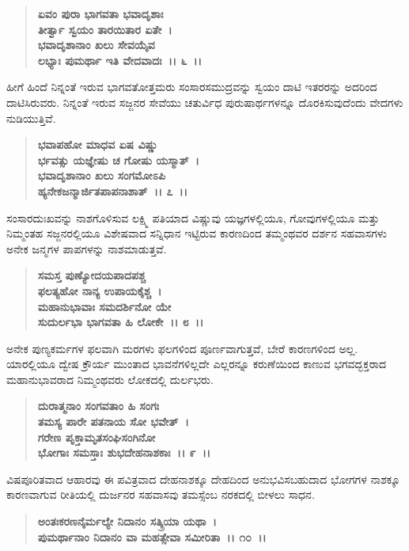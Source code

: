 \begin{verse}
\textbf{ಏವಂ ಪುರಾ ಭಾಗವತಾ ಭವಾದೃಶಾಃ} \\\textbf{ತೀರ್ತ್ವಾ ಸ್ವಯಂ ತಾರಯಿತಾರ ಏತೇ~।}\\\textbf{ಭವಾದೃಶಾನಾಂ ಖಲು ಸೇವಯೈವ} \\\textbf{ಲಭ್ಯಾಃ ಪುಮರ್ಥಾ ಇತಿ ವೇದವಾದಃ~।। ೬~।।}
\end{verse}

ಹೀಗೆ ಹಿಂದೆ ನಿನ್ನಂತೆ ಇರುವ ಭಾಗವತೋತ್ತಮರು ಸಂಸಾರಸಮುದ್ರವನ್ನು ಸ್ವಯಂ ದಾಟಿ ಇತರರನ್ನು ಅದರಿಂದ ದಾಟಿಸಿರುವರು. ನಿನ್ನಂತೆ ಇರುವ ಸಜ್ಜನರ ಸೇವೆಯು ಚತುರ್ವಿಧ ಪುರುಷಾರ್ಥಗಳನ್ನೂ ದೊರಕಿಸುವುದೆಂದು ವೇದಗಳು ನುಡಿಯುತ್ತಿವೆ.

\begin{verse}
\textbf{ಭವಾಪಹೋ ಮಾಧವ ಏಷ ವಿಷ್ಣು} \\\textbf{ರ್ಭವತ್ಸು ಯಜ್ಞೇಷು ಚ ಗೋಷು ಯಸ್ಮಾತ್~।}\\\textbf{ಭವಾದೃಶಾನಾಂ ಖಲು ಸಂಗಮೋಽಪಿ} \\\textbf{ಹ್ಯನೇಕಜನ್ಮಾರ್ಜಿತಪಾಪನಾಶಾತ್~।। ೭~।।}
\end{verse}

ಸಂಸಾರದುಃಖವನ್ನು ನಾಶಗೊಳಿಸುವ ಲಕ್ಷ್ಮಿ ಪತಿಯಾದ ವಿಷ್ಣುವು ಯಜ್ಞಗಳಲ್ಲಿಯೂ, ಗೋವುಗಳಲ್ಲಿಯೂ ಮತ್ತು ನಿಮ್ಮಂತಹ ಸಜ್ಜನರಲ್ಲಿಯೂ ವಿಶೇಷವಾದ ಸನ್ನಿಧಾನ ಇಟ್ಟಿರುವ ಕಾರಣದಿಂದ ತಮ್ಮಂಥವರ ದರ್ಶನ ಸಹವಾಸಗಳು ಅನೇಕ ಜನ್ಮಗಳ ಪಾಪಗಳನ್ನು ನಾಶಮಾಡುತ್ತವೆ.

\begin{verse}
\textbf{ಸಮಸ್ತ ಪುಣ್ಯೋದಯಪಾದಪಶ್ಚ} \\\textbf{ಫಲತ್ಯಹೋ ನಾನ್ಯ ಉಪಾಯಕೈಶ್ಚ~।}\\\textbf{ಮಹಾನುಭಾವಾಃ ಸಮದರ್ಶಿನೋ ಯೇ} \\\textbf{ಸುದುರ್ಲಭಾ ಭಾಗವತಾ ಹಿ ಲೋಕೇ~।। ೮~।।}
\end{verse}

ಅನೇಕ ಪುಣ್ಯಕರ್ಮಗಳ ಫಲವಾಗಿ ಮರಗಳು ಫಲಗಳಿಂದ ಪೂರ್ಣವಾಗುತ್ತವೆ, ಬೇರೆ ಕಾರಣಗಳಿಂದ ಅಲ್ಲ. ಯಾರಲ್ಲಿಯೂ ದ್ವೇಷ ಕ್ರೌರ್ಯ ಮುಂತಾದ ಭಾವನೆಗಳಿಲ್ಲದೇ ಎಲ್ಲರನ್ನೂ ಕರುಣೆಯಿಂದ ಕಾಣುವ ಭಗವದ್ಭಕ್ತರಾದ ಮಹಾನುಭಾವರಾದ ನಿಮ್ಮಂಥವರು ಲೋಕದಲ್ಲಿ ದುರ್ಲಭರು.

\begin{verse}
\textbf{ದುರಾತ್ಮನಾಂ ಸಂಗವತಾಂ ಹಿ ಸಂಗಃ} \\\textbf{ತಮಸ್ಯ ಪಾರೇ ಪತನಾಯ ಸೋ ಭವೇತ್~।}\\\textbf{ಗರೇಣ ಪೃಕ್ತಾಮೃತಸಂಘಿಸಂಗಿನೋ} \\\textbf{ಭೋಗಾಃ ಸಮಸ್ತಾಃ ಶುಭದೇಹನಾಶಕಾಃ~।। ೯~।।}
\end{verse}

ವಿಷಪೂರಿತವಾದ ಆಹಾರವು ಈ ಪವಿತ್ರವಾದ ದೇಹನಾಶಕ್ಕೂ ದೇಹದಿಂದ ಅನುಭವಿಸಬಹುದಾದ ಭೋಗಗಳ ನಾಶಕ್ಕೂ ಕಾರಣವಾಗುವ ರೀತಿಯಲ್ಲಿ ದುರ್ಜನರ ಸಹವಾಸವು ತಮಸ್ಸೆಂಬ ನರಕದಲ್ಲಿ ಬೀಳಲು ಸಾಧನ.

\begin{verse}
\textbf{ಅಂತಃಕರಣನೈರ್ಮಲ್ಯೇ ನಿದಾನಂ ಸತ್ಕ್ರಿಯಾ ಯಥಾ~।}\\\textbf{ಪುಮರ್ಥಾನಾಂ ನಿದಾನಂ ವಾ ಮಹತ್ಸೇವಾ ಸಮೀರಿತಾ~।। ೧೦~।।}
\end{verse}

